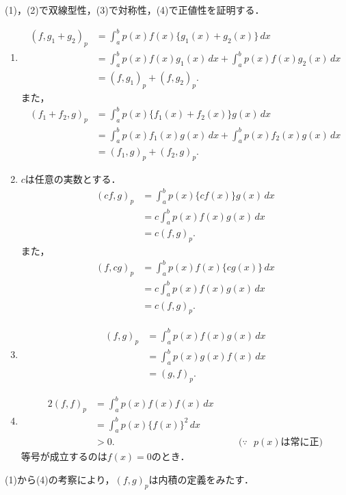 \begin{tproof}
  (1)，(2)で双線型性，(3)で対称性，(4)で正値性を証明する．
  \begin{enumerate}[(1)]
    \item
          \begin{align*}
            (f,g_1+g_2)_p & = \int_{a}^{b} p(x) f(x) \{ g_1(x)+g_2(x) \} \, dx                           \\
                          & = \int_{a}^{b} p(x) f(x) g_1 (x) \, dx + \int_{a}^{b} p(x) f(x) g_2(x) \, dx \\
                          & = (f,g_1)_p + (f,g_2)_p.
          \end{align*}
          また，
          \begin{align*} (f_1 + f_2 , g)_p & = \int_{a}^{b} p(x) \{ f_1(x)+f_2(x) \} g(x) \, dx                            \\
                                 & = \int_{a}^{b} p(x) f_1 (x) g(x) \, dx + \int_{a}^{b} p(x) f_2 (x) g(x) \, dx \\
                                 & = (f_1,g)_p + (f_2,g)_p.
          \end{align*}
    \item $c$は任意の実数とする．
          \begin{align*}
            (cf,g)_p & = \int_{a}^{b} p(x) \{ cf(x) \} g(x) \, dx \\
                     & = c \int_{a}^{b} p(x) f(x) g(x) \, dx      \\
                     & = c(f,g)_p .
          \end{align*}
          また，
          \begin{align*}
            (f,cg)_p & = \int_{a}^{b} p(x) f(x) \{ cg(x) \} \, dx \\
                     & = c \int_{a}^{b} p(x) f(x) g(x) \, dx      \\
                     & = c(f,g)_p .
          \end{align*}
    \item
          \begin{align*}
            (f,g)_p & = \int_{a}^{b} p(x) f(x) g(x) \, dx \\
                    & = \int_{a}^{b} p(x) g(x) f(x) \, dx \\
                    & =(g,f)_p .
          \end{align*}
    \item
          \begin{alignat*}{2}
            (f,f)_p & = \int_{a}^{b} p(x) f(x) f(x) \, dx   &       &                                 \\
                    & =\int_{a}^{b} p(x) \{ f(x) \}^2 \, dx &       &                                 \\
                    & >0.                                   & \quad & \text{($\because$~ $p(x)$は常に正)}
          \end{alignat*}
          等号が成立するのは$f(x)=0$のとき．
  \end{enumerate}
  (1)から(4)の考察により，$(f,g)_p$は内積の定義をみたす．
\end{tproof}

